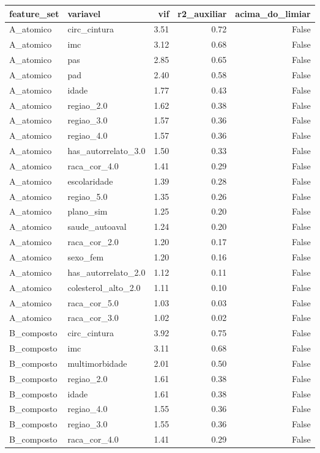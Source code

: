 \begin{tabular}{llrrr}
\toprule
feature_set & variavel & vif & r2_auxiliar & acima_do_limiar \\
\midrule
A_atomico & circ_cintura & 3.51 & 0.72 & False \\
A_atomico & imc & 3.12 & 0.68 & False \\
A_atomico & pas & 2.85 & 0.65 & False \\
A_atomico & pad & 2.40 & 0.58 & False \\
A_atomico & idade & 1.77 & 0.43 & False \\
A_atomico & regiao_2.0 & 1.62 & 0.38 & False \\
A_atomico & regiao_3.0 & 1.57 & 0.36 & False \\
A_atomico & regiao_4.0 & 1.57 & 0.36 & False \\
A_atomico & has_autorrelato_3.0 & 1.50 & 0.33 & False \\
A_atomico & raca_cor_4.0 & 1.41 & 0.29 & False \\
A_atomico & escolaridade & 1.39 & 0.28 & False \\
A_atomico & regiao_5.0 & 1.35 & 0.26 & False \\
A_atomico & plano_sim & 1.25 & 0.20 & False \\
A_atomico & saude_autoaval & 1.24 & 0.20 & False \\
A_atomico & raca_cor_2.0 & 1.20 & 0.17 & False \\
A_atomico & sexo_fem & 1.20 & 0.16 & False \\
A_atomico & has_autorrelato_2.0 & 1.12 & 0.11 & False \\
A_atomico & colesterol_alto_2.0 & 1.11 & 0.10 & False \\
A_atomico & raca_cor_5.0 & 1.03 & 0.03 & False \\
A_atomico & raca_cor_3.0 & 1.02 & 0.02 & False \\
B_composto & circ_cintura & 3.92 & 0.75 & False \\
B_composto & imc & 3.11 & 0.68 & False \\
B_composto & multimorbidade & 2.01 & 0.50 & False \\
B_composto & regiao_2.0 & 1.61 & 0.38 & False \\
B_composto & idade & 1.61 & 0.38 & False \\
B_composto & regiao_4.0 & 1.55 & 0.36 & False \\
B_composto & regiao_3.0 & 1.55 & 0.36 & False \\
B_composto & raca_cor_4.0 & 1.41 & 0.29 & False \\

\end{tabular}
